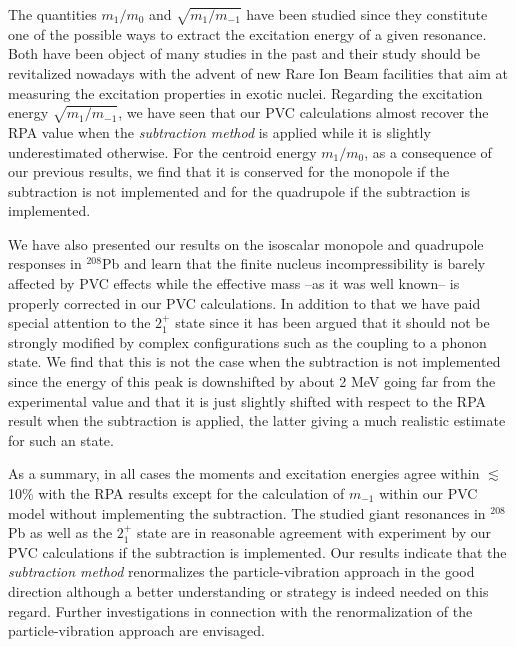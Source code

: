 \documentclass[12pt,a4paper,final]{iopart}
\begin{document}
The quantities $m_1/m_0$ and $\sqrt{m_1/m_{-1}}$ have been studied since they constitute one of the possible ways to extract the excitation energy of a given resonance. Both have been object of many studies in the past and their study should be revitalized nowadays with the advent of new Rare Ion Beam facilities that aim at measuring the excitation properties in exotic nuclei. Regarding the excitation energy $\sqrt{m_1/m_{-1}}$, we have seen that our PVC calculations almost recover the RPA value when the {\it subtraction method} is applied while it is slightly underestimated otherwise. For the centroid energy $m_1/m_0$, as a consequence of our previous results, we find that it is conserved for the monopole if the subtraction is not implemented and for the quadrupole if the subtraction is implemented. 

We have also presented our results on the isoscalar monopole and quadrupole responses in ${}^{208}$Pb and learn that the finite nucleus incompressibility is barely affected by PVC effects while the effective mass --as it was well known-- is properly corrected in our PVC calculations. In addition to that we have paid special attention to the $2_1^+$ state since it has been argued \cite{lyutorovich2016} that it should not be strongly modified by complex configurations such as the coupling to a phonon state. We find that this is not the case when the subtraction is not implemented since the energy of this peak is downshifted by about 2 MeV going far from the experimental value and that it is just slightly shifted with respect to the RPA result when the subtraction is applied, the latter giving a much realistic estimate for such an state. 

As a summary, in all cases the moments and excitation energies agree within $\lesssim$10\% with the RPA results except for the calculation of $m_{-1}$ within our PVC model without implementing the subtraction. The studied giant resonances in ${}^{208}$Pb as well as the $2_1^+$ state are in reasonable agreement with experiment by our PVC calculations if the subtraction is implemented. Our results indicate that the {\it subtraction method} renormalizes the particle-vibration approach in the good direction although a better understanding or strategy is indeed needed on this regard. Further investigations in connection with the renormalization of the particle-vibration approach are envisaged.         


\appendix
\end{document}
